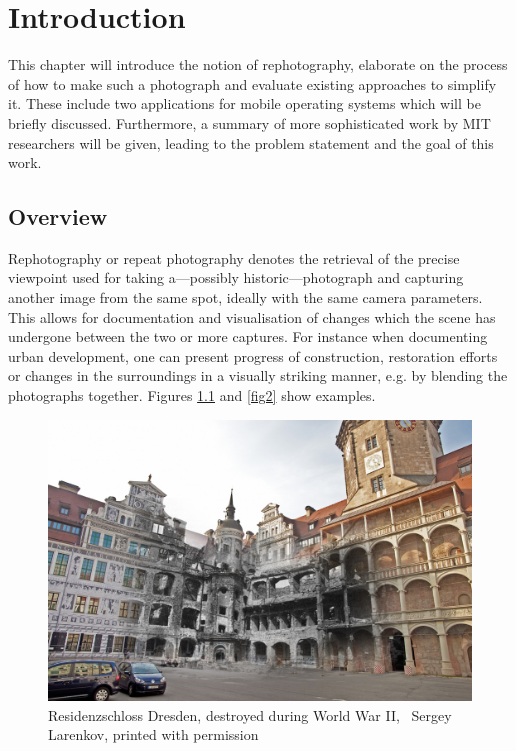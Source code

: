 \chapter{Introduction}

This chapter will introduce the notion of rephotography, elaborate on the
process of how to make such a photograph and evaluate existing approaches to
simplify it. These include two applications for mobile operating systems which
will be briefly discussed. Furthermore, a summary of more sophisticated work by
MIT researchers will be given, leading to the problem statement and the goal of
this work.

\section{Overview}

Rephotography or repeat photography denotes the retrieval of the precise
viewpoint used for taking a---possibly historic---photograph and capturing
another image from the same spot, ideally with the same camera parameters. This
allows for documentation and visualisation of changes which the scene has
undergone between the two or more captures.  For instance when documenting urban
development, one can present progress of construction, restoration efforts or
changes in the surroundings in a visually striking manner, e.g. by blending the
photographs together.  Figures \ref{fig1} and \ref{fig2} show examples.

\begin{figure}
   \includegraphics[width=\textwidth]{gfx/1945_2014_Residenzschloss_small.jpg}
   \caption{Residenzschloss Dresden, destroyed during World War II,
   \textcopyright\ Sergey Larenkov, printed with permission}
   \label{fig1}
\end{figure}

